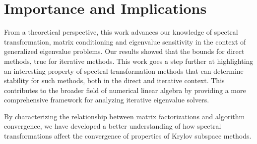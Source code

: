 \section{Importance and Implications}
From a theoretical perspective, this work advances our knowledge of spectral transformation, matrix conditioning and eigenvalue sensitivity in the context of  generalized eigenvalue problems. Our results showed that the  bounds for direct methods,  true for iterative methods. This work goes a step further at highlighting an interesting property of spectral transformation methods that can determine stability for such methods, both in the direct and iterative context. This contributes to the broader field of numerical linear algebra by providing a more comprehensive framework for analyzing iterative eigenvalue solvers.

By characterizing the relationship between matrix factorizations and algorithm convergence, we have developed a better understanding of how spectral transformations affect the convergence of properties of Krylov subspace methods.



